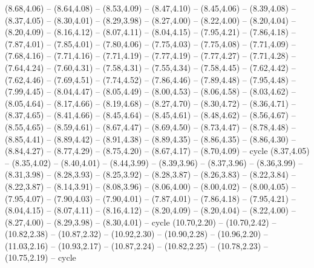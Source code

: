 \expandafter\def\csname geo:gebiet:KAZ\endcsname{
  (8.68,4.06) -- (8.64,4.08) -- (8.53,4.09) -- (8.47,4.10) -- (8.45,4.06) -- (8.39,4.08) -- (8.37,4.05) -- (8.30,4.01) -- (8.29,3.98) -- (8.27,4.00) -- (8.22,4.00) -- (8.20,4.04) -- (8.20,4.09) -- (8.16,4.12) -- (8.07,4.11) -- (8.04,4.15) -- (7.95,4.21) -- (7.86,4.18) -- (7.87,4.01) -- (7.85,4.01) -- (7.80,4.06) -- (7.75,4.03) -- (7.75,4.08) -- (7.71,4.09) -- (7.68,4.16) -- (7.71,4.16) -- (7.71,4.19) -- (7.77,4.19) -- (7.77,4.27) -- (7.71,4.28) -- (7.64,4.24) -- (7.60,4.31) -- (7.58,4.31) -- (7.55,4.34) -- (7.58,4.45) -- (7.62,4.42) -- (7.62,4.46) -- (7.69,4.51) -- (7.74,4.52) -- (7.86,4.46) -- (7.89,4.48) -- (7.95,4.48) -- (7.99,4.45) -- (8.04,4.47) -- (8.05,4.49) -- (8.00,4.53) -- (8.06,4.58) -- (8.03,4.62) -- (8.05,4.64) -- (8.17,4.66) -- (8.19,4.68) -- (8.27,4.70) -- (8.30,4.72) -- (8.36,4.71) -- (8.37,4.65) -- (8.41,4.66) -- (8.45,4.64) -- (8.45,4.61) -- (8.48,4.62) -- (8.56,4.67) -- (8.55,4.65) -- (8.59,4.61) -- (8.67,4.47) -- (8.69,4.50) -- (8.73,4.47) -- (8.78,4.48) -- (8.85,4.41) -- (8.89,4.42) -- (8.91,4.38) -- (8.89,4.35) -- (8.86,4.35) -- (8.86,4.30) -- (8.84,4.27) -- (8.77,4.29) -- (8.75,4.20) -- (8.67,4.17) -- (8.70,4.09) -- cycle}
\expandafter\def\csname geo:gebiet:UZB\endcsname{
  (8.37,4.05) -- (8.35,4.02) -- (8.40,4.01) -- (8.44,3.99) -- (8.39,3.96) -- (8.37,3.96) -- (8.36,3.99) -- (8.31,3.98) -- (8.28,3.93) -- (8.25,3.92) -- (8.28,3.87) -- (8.26,3.83) -- (8.22,3.84) -- (8.22,3.87) -- (8.14,3.91) -- (8.08,3.96) -- (8.06,4.00) -- (8.00,4.02) -- (8.00,4.05) -- (7.95,4.07) -- (7.90,4.03) -- (7.90,4.01) -- (7.87,4.01) -- (7.86,4.18) -- (7.95,4.21) -- (8.04,4.15) -- (8.07,4.11) -- (8.16,4.12) -- (8.20,4.09) -- (8.20,4.04) -- (8.22,4.00) -- (8.27,4.00) -- (8.29,3.98) -- (8.30,4.01) -- cycle}
\expandafter\def\csname geo:gebiet:PNG\endcsname{
  (10.70,2.20) -- (10.70,2.42) -- (10.82,2.38) -- (10.87,2.32) -- (10.92,2.30) -- (10.90,2.28) -- (10.96,2.20) -- (11.03,2.16) -- (10.93,2.17) -- (10.87,2.24) -- (10.82,2.25) -- (10.78,2.23) -- (10.75,2.19) -- cycle}
